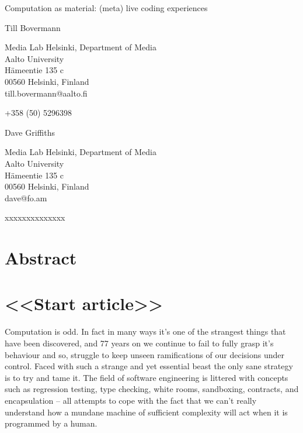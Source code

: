 \documentclass[letterpaper, 12pt]{article}
\begin{document}
{\cmjTitle 	Computation as material: (meta) live coding experiences}
\vspace*{24pt}


{\cmjAuthor Till Bovermann}
\newline
\begin{cmjAuthorAddress}
	Media Lab Helsinki, Department of Media\\
	Aalto University\\
	H\"ameentie 135 c\\
	00560 Helsinki, Finland\\
	till.bovermann@aalto.fi
\end{cmjAuthorAddress}

\vspace*{24pt}
{\cmjAuthorPhone +358 (50) 5296398}
\vspace*{24pt}

{\cmjAuthor Dave Griffiths}
\newline
\begin{cmjAuthorAddress}
	Media Lab Helsinki, Department of Media\\
	Aalto University\\
	H\"ameentie 135 c\\
	00560 Helsinki, Finland\\
	dave@fo.am
\end{cmjAuthorAddress}

\vspace*{24pt}
{\cmjAuthorPhone xxxxxxxxxxxxxx}
\vspace*{24pt}


\section*{Abstract}



\section{<<Start article>>}


Computation is odd. 
In fact in many ways it's one of the strangest things that have been discovered, and 77 years on we continue to fail to fully grasp it's behaviour and so, struggle to keep unseen ramifications of our decisions under control. Faced with such a strange and yet essential beast the only sane strategy is to try and tame it. 
The field of software engineering is littered with concepts such as regression testing, type checking, white rooms, sandboxing, contracts, and encapsulation -- all attempts to cope with the fact that we can't really understand how a mundane machine of sufficient complexity will act when it is programmed by a human.
\end{document}
